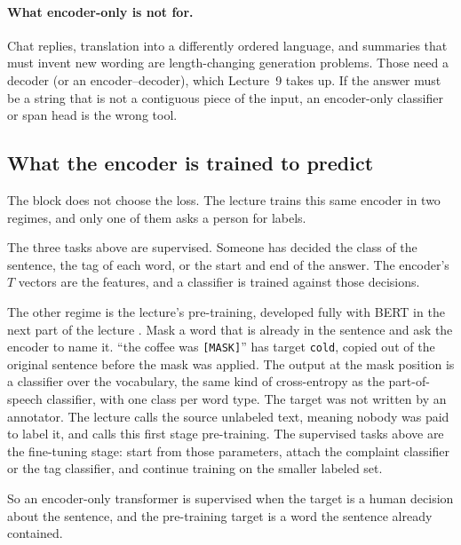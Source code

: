 \documentclass[11pt]{article}
\begin{document}
\paragraph{What encoder-only is not for.}
Chat replies, translation into a differently ordered language, and
summaries that must invent new wording are length-changing generation
problems. Those need a decoder (or an encoder--decoder), which Lecture~9
takes up. If the answer must be a string that is not a contiguous piece of
the input, an encoder-only classifier or span head is the wrong tool.

\subsection{What the encoder is trained to predict}

The block does not choose the loss. The lecture trains this same encoder in
two regimes, and only one of them asks a person for labels.

The three tasks above are supervised. Someone has decided the class of the
sentence, the tag of each word, or the start and end of the answer. The
encoder's \(T\) vectors are the features, and a classifier is trained
against those decisions.

The other regime is the lecture's pre-training, developed fully with BERT
in the next part of the lecture \cite{devlin2019bert}. Mask a word that is
already in the sentence and ask the encoder to name it. ``the coffee was
\texttt{[MASK]}'' has target \texttt{cold}, copied out of the original
sentence before the mask was applied. The output at the mask position is a
classifier over the vocabulary, the same kind of cross-entropy as the
part-of-speech classifier, with one class per word type. The target was not
written by an annotator. The lecture calls the source unlabeled text,
meaning nobody was paid to label it, and calls this first stage
pre-training. The supervised tasks above are the fine-tuning stage: start
from those parameters, attach the complaint classifier or the tag
classifier, and continue training on the smaller labeled set.

So an encoder-only transformer is supervised when the target is a human
decision about the sentence, and the pre-training target is a word the
sentence already contained.
\end{document}
